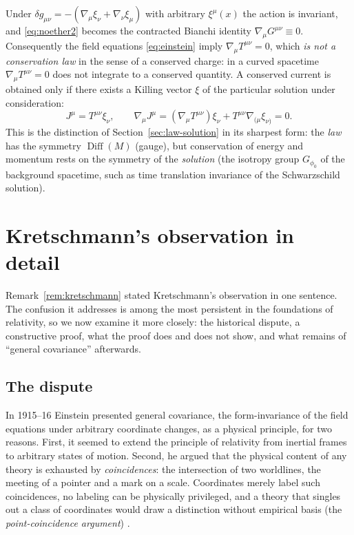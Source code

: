 \documentclass[11pt,a4paper,openany]{book}
\theoremstyle{definition}
\theoremstyle{plain}
\theoremstyle{remark}
\DeclareMathOperator{\Diff}{Diff}
\begin{document}
Under $\delta g_{\mu\nu}=-(\nabla_\mu\xi_\nu+\nabla_\nu\xi_\mu)$ with arbitrary
$\xi^\mu(x)$ the action is invariant, and \eqref{eq:noether2} becomes the
contracted Bianchi identity $\nabla_\mu G^{\mu\nu}\equiv0$. Consequently the
field equations \eqref{eq:einstein} imply $\nabla_\mu T^{\mu\nu}=0$, which
\emph{is not a conservation law} in the sense of a conserved charge: in a
curved spacetime $\nabla_\mu T^{\mu\nu}=0$ does not integrate to a conserved
quantity. A conserved current is obtained only if there exists a Killing vector
$\xi$ of the particular solution under consideration:
\begin{equation}
  J^\mu=T^{\mu\nu}\xi_\nu,\qquad
  \nabla_\mu J^\mu=(\nabla_\mu T^{\mu\nu})\xi_\nu+T^{\mu\nu}\nabla_{(\mu}\xi_{\nu)}=0.
\end{equation}
This is the distinction of Section~\ref{sec:law-solution} in its
sharpest form: the \emph{law} has the symmetry $\Diff(M)$ (gauge), but
conservation of energy and momentum rests on the symmetry of the \emph{solution}
(the isotropy group $G_{\phi_0}$ of the background spacetime, such as time
translation invariance of the Schwarzschild solution).

\section{Kretschmann's observation in detail}
\label{sec:kretschmann}

Remark~\ref{rem:kretschmann} stated Kretschmann's observation in one
sentence. The confusion it addresses is among the most persistent in the
foundations of relativity, so we now examine it more closely: the historical
dispute, a constructive proof, what the proof does and does not show, and what
remains of ``general covariance'' afterwards.

\subsection{The dispute}

In 1915--16 Einstein presented general covariance, the form-invariance of the
field equations under arbitrary coordinate changes, as a physical principle,
for two reasons. First, it seemed to extend the principle of relativity from
inertial frames to arbitrary states of motion. Second, he argued that the
physical content of any theory is exhausted by \emph{coincidences}: the
intersection of two worldlines, the meeting of a pointer and a mark on a
scale. Coordinates merely label such coincidences, no labeling can be
physically privileged, and a theory that singles out a class of coordinates
would draw a distinction without empirical basis (the \emph{point-coincidence
argument}) \cite{norton}.
\end{document}
